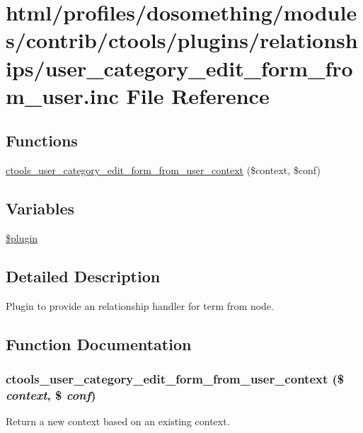\hypertarget{user__category__edit__form__from__user_8inc}{
\section{html/profiles/dosomething/modules/contrib/ctools/plugins/relationships/user\_\-category\_\-edit\_\-form\_\-from\_\-user.inc File Reference}
\label{user__category__edit__form__from__user_8inc}
}
\subsection*{Functions}
\begin{DoxyCompactItemize}
\item 
\hyperlink{user__category__edit__form__from__user_8inc_a76ef5e5573ed450b0c2303925be71cc9}{ctools\_\-user\_\-category\_\-edit\_\-form\_\-from\_\-user\_\-context} (\$context, \$conf)
\end{DoxyCompactItemize}
\subsection*{Variables}
\begin{DoxyCompactItemize}
\item 
\hyperlink{user__category__edit__form__from__user_8inc_ada8a7130088351710bb02ed622d6bf65}{\$plugin}
\end{DoxyCompactItemize}


\subsection{Detailed Description}
Plugin to provide an relationship handler for term from node. 

\subsection{Function Documentation}
\hypertarget{user__category__edit__form__from__user_8inc_a76ef5e5573ed450b0c2303925be71cc9}{
\subsubsection[{ctools\_\-user\_\-category\_\-edit\_\-form\_\-from\_\-user\_\-context}]{\setlength{\rightskip}{0pt plus 5cm}ctools\_\-user\_\-category\_\-edit\_\-form\_\-from\_\-user\_\-context (\$ {\em context}, \/  \$ {\em conf})}}
\label{user__category__edit__form__from__user_8inc_a76ef5e5573ed450b0c2303925be71cc9}
Return a new context based on an existing context. 

